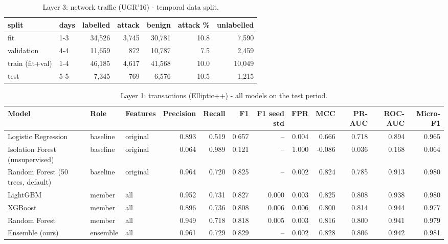 \begin{table}[t]
\centering
\caption{Layer 3: network traffic (UGR'16) - temporal data split.}
\label{tab:network-split}
\begin{tabular}{llrrrrr}
\toprule
split & days & labelled & attack & benign & attack \% & unlabelled \\
\midrule
fit & 1-3 & 34,526 & 3,745 & 30,781 & 10.8 & 7,590 \\
validation & 4-4 & 11,659 & 872 & 10,787 & 7.5 & 2,459 \\
train (fit+val) & 1-4 & 46,185 & 4,617 & 41,568 & 10.0 & 10,049 \\
test & 5-5 & 7,345 & 769 & 6,576 & 10.5 & 1,215 \\
\bottomrule
\end{tabular}
\end{table}

\begin{table}[t]
\centering
\caption{Layer 1: transactions (Elliptic++) - all models on the test period.}
\label{tab:transaction-models}
\begin{tabular}{lllrrrrrrrrr}
\toprule
Model & Role & Features & Precision & Recall & F1 & F1 seed std & FPR & MCC & PR-AUC & ROC-AUC & Micro-F1 \\
\midrule
Logistic Regression & baseline & original & 0.893 & 0.519 & 0.657 & -- & 0.004 & 0.666 & 0.718 & 0.894 & 0.965 \\
Isolation Forest (unsupervised) & baseline & original & 0.064 & 0.989 & 0.121 & -- & 1.000 & -0.086 & 0.036 & 0.168 & 0.064 \\
Random Forest (50 trees, default) & baseline & original & 0.964 & 0.720 & 0.825 & -- & 0.002 & 0.824 & 0.785 & 0.913 & 0.980 \\
LightGBM & member & all & 0.952 & 0.731 & 0.827 & 0.000 & 0.003 & 0.825 & 0.808 & 0.938 & 0.980 \\
XGBoost & member & all & 0.896 & 0.736 & 0.808 & 0.006 & 0.006 & 0.800 & 0.814 & 0.944 & 0.977 \\
Random Forest & member & all & 0.949 & 0.718 & 0.818 & 0.005 & 0.003 & 0.816 & 0.800 & 0.941 & 0.979 \\
Ensemble (ours) & ensemble & all & 0.961 & 0.729 & 0.829 & -- & 0.002 & 0.828 & 0.806 & 0.942 & 0.981 \\
\bottomrule
\end{tabular}
\end{table}

